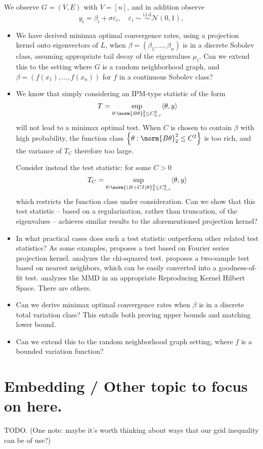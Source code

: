 \documentclass{article}
\newcommand{\set}[1]{\left\{#1\right\}}
\newcommand{\dotp}[2]{\langle #1, #2 \rangle}
\newcommand{\1}{\mathbb{I}}
\theoremstyle{alden}
\theoremstyle{aldenthm}
\theoremstyle{definition}
\theoremstyle{remark}
\begin{document}
We observe $G = (V,E)$ with $V = [n]$, and in addition observe
\begin{equation*}
y_i = \beta_i + \sigma \varepsilon_i, \quad \varepsilon_i \sim \overset{\textrm{i.i.d}}{\sim} \mathcal{N}(0,1),
\end{equation*}

\begin{itemize}
	\item We have derived minimax optimal convergence rates, using a projection kernel onto eigenvectors of $L$, when $\beta = (\beta_1, \ldots, \beta_n)$ is in a discrete Sobolev class, assuming appropriate tail decay of the eigenvalues $\mu_i$. Can we extend this to the setting where $G$ is a random neighborhood graph, and $\beta = (f(x_1), \ldots, f(x_n))$ for $f$ in a continuous Sobolev class?
	\item We know that simply considering an IPM-type statistic of the form
	\begin{equation*}
	T = \sup_{\theta: \norm{B\theta}_2^2 \leq C_{n,r}^2} \dotp{\theta}{y}
	\end{equation*}
	will not lead to a minimax optimal test. When $C$ is chosen to contain $\beta$ with high probability, the function class $\set{\theta: \norm{B\theta}_2^2 \leq C^2}$ is too rich, and the variance of $T_C$ therefore too large. 
	
	Consider instead the test statistic: for some $C > 0$
	\begin{equation*}
	T_C = \sup_{\theta: \norm{(B + C I)\theta}_2^2 \leq C_{n,r}^2} \dotp{\theta}{y}
	\end{equation*}
	which restricts the function class under consideration. 
	Can we show that this test statistic -- based on a regularization, rather than truncation, of the eigenvalues -- achieves similar results to the aforementioned projection kernel?
	\item In what practical cases does such a test statistic outperform other related test statistics? As some examples, \citep{ingster2009} proposes a test based on Fourier series projection kernel. \citep{ariascastro2018} analyzes the chi-squared test. \citep{schilling1986} proposes a two-sample test based on nearest neighbors, which can be easily converted into a goodness-of-fit test. \citep{gretton2012} analyzes the MMD in an appropriate Reproducing Kernel Hilbert Space. There are others. 
	\item Can we derive minimax optimal convergence rates when $\beta$ is in a discrete total variation class? This entails both proving upper bounds and matching lower bound. 
	\item Can we extend this to the random neighborhood graph setting, where $f$ is a bounded variation function?
\end{itemize}

\section{Embedding / Other topic to focus on here.}

TODO. (One note: maybe it's worth thinking about ways that our grid inequality can be of use?)





\end{document}

